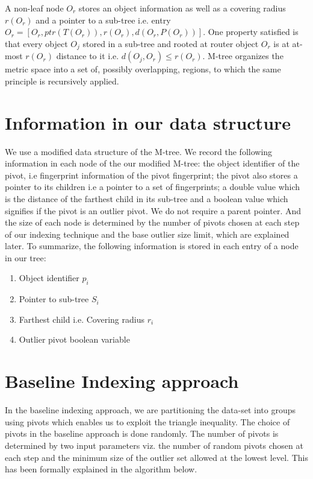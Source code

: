 A non-leaf node $O_r$ stores an object information as well as a covering radius $r(O_r)$ and a pointer to a sub-tree i.e. entry $O_r=[ O_r, ptr(T(O_r)), r(O_r), d(O_r, P(O_r)) ]$. One property satisfied is that every object $O_j$ stored in a sub-tree and rooted at router object $O_r$ is at at-most $r(O_r)$ distance to it i.e. $d(O_j , O_r) ≤ r(O_r)$. M-tree organizes the metric space into a set of, possibly overlapping, regions, to which the same principle is recursively applied.\\




\section{Information in our data structure}

We use a modified data structure of the M-tree. We record the following information in each node of the our modified M-tree: the object identifier of the pivot, i.e fingerprint information of the pivot fingerprint; the pivot also stores a pointer to its children i.e a pointer to a set of fingerprints; a double value which is the distance of the farthest child in its sub-tree and a boolean value which signifies if the pivot is an outlier pivot. We do not require a parent pointer. And the size of each node is determined by the number of pivots chosen at each step of our indexing technique and the base outlier size limit, which are explained later. To summarize, the following information is stored in each entry of a node in our tree:

\begin{enumerate}
	\item Object identifier $p_i$
	\item Pointer to sub-tree $S_i$
	\item Farthest child i.e. Covering radius $r_i$
	\item Outlier pivot boolean variable
\end{enumerate}

\section{Baseline Indexing approach}
In the baseline indexing approach, we are partitioning the data-set into groups using pivots which enables us to exploit the triangle inequality. The choice of pivots in the baseline approach is done randomly. The number of pivots is determined by two input parameters viz. the number of random pivots chosen at each step and the minimum size of the outlier set allowed at the lowest level. This has been formally explained in the algorithm below. \\

